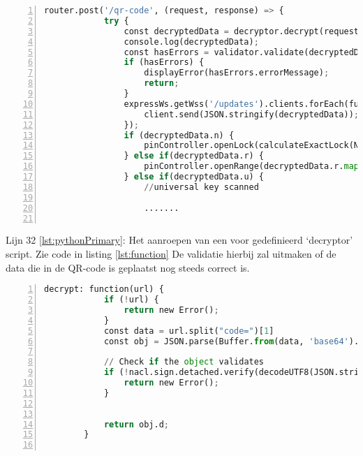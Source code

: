 \begin{enumerate}
    
     \begin{lstlisting}[language=Python, caption={De node.js server die de nodige validatie zal uitvoeren en de verdere communicatie afronden.}, label=lst:pytho, numbers=left]
        router.post('/qr-code', (request, response) => {
            try {
                const decryptedData = decryptor.decrypt(request.body.tag);
                console.log(decryptedData);
                const hasErrors = validator.validate(decryptedData, Number(config.unit));
                if (hasErrors) {
                    displayError(hasErrors.errorMessage);
                    return;
                }
                expressWs.getWss('/updates').clients.forEach(function (client) {
                    client.send(JSON.stringify(decryptedData));
                });
                if (decryptedData.n) {
                    pinController.openLock(calculateExactLock(Number(decryptedData.n), Number(config.unit)));
                } else if(decryptedData.r) {
                    pinController.openRange(decryptedData.r.map(l => calculateExactLock(Number(l), Number(config.unit))))
                } else if(decryptedData.u) {
                    //universal key scanned
                    
                    .......
        
    \end{lstlisting}

    Lijn 32 \ref{lst:pythonPrimary}: Het aanroepen van een voor gedefinieerd ‘decryptor’ script. Zie code in listing \ref{lst:function} De validatie hierbij zal uitmaken of de data die in de QR-code is geplaatst nog steeds correct is.    
    \begin{lstlisting}[language=Python, caption={ De parameter genaamd ‘code’ wordt verwerkt en ontcijferd, indien de QR-data is aangepast zal het een error terug geven.}, label=lst:function, numbers=left]
        decrypt: function(url) {
            if (!url) {
                return new Error();
            }
            const data = url.split("code=")[1]
            const obj = JSON.parse(Buffer.from(data, 'base64').toString('utf8'));
            
            // Check if the object validates
            if (!nacl.sign.detached.verify(decodeUTF8(JSON.stringify(obj.d)), decodeBase64(obj.v), decodeBase64(publicKey))) {
                return new Error();
            }
            
            
            return obj.d;
        }
                    

\end{lstlisting}
\end{enumerate}
